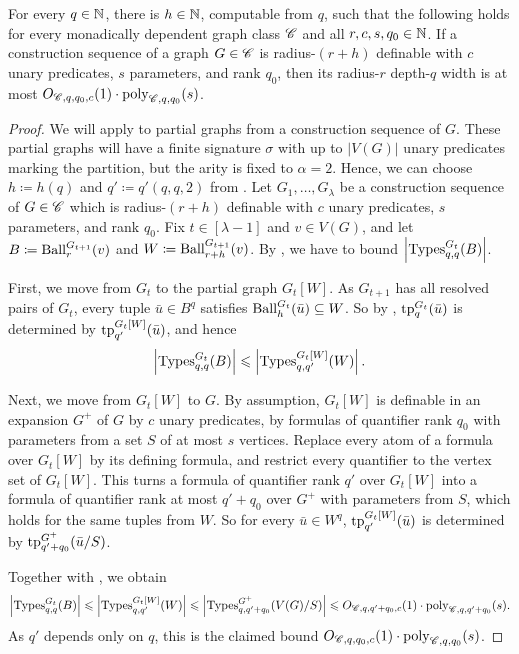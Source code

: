 \begin{lemma}\label{lem:skel-def-to-types}
  For every $q\in\mathbb N$, there is $h\in\mathbb N$, computable from $q$, such that the following holds for every monadically dependent graph class $\mathscr C$ and all $r,c,s,q_0\in\mathbb N$.
  If a construction sequence of a graph $G\in\mathscr C$ is radius-$(r+h)$ definable with $c$ unary predicates, $s$ parameters, and rank $q_0$,
  then its radius-$r$ depth-$q$ width is at most $O_{\mathscr C,q,q_0,c}(1)\cdot\mathrm{poly}_{\mathscr C,q,q_0}(s)$.
\end{lemma}
\begin{proof}
  We will apply  to partial graphs from a construction sequence of $G$.
  These partial graphs will have a finite signature $\sigma$ with up to $|V(G)|$ unary predicates marking the partition, but the arity is fixed to $\alpha=2$.
  Hence, we can choose $h\coloneqq h(q)$ and $q'\coloneqq q'(q,q,2)$ from .
  Let $G_1,\ldots,G_\lambda$ be a construction sequence of $G\in\mathscr C$ which is radius-$(r+h)$ definable with $c$ unary predicates, $s$ parameters, and rank $q_0$.
  Fix $t\in[\lambda-1]$ and $v\in V(G)$, and let $B\coloneqq\operatorname{Ball}^{G_{t+1}}_r(v)$ and $W\coloneqq\operatorname{Ball}^{G_{t+1}}_{r+h}(v)$.
  By , we have to bound $\left|\operatorname{Types}^{G_t}_{q,q}(B)\right|$.

  First, we move from $G_t$ to the partial graph $G_t[W]$.
  As $G_{t+1}$ has all resolved pairs of $G_t$, every tuple $\bar u\in B^q$ satisfies $\operatorname{Ball}^{G_t}_h(\bar u)\subseteq W$.
  So by , $\textnormal{tp}^{G_t}_q(\bar u)$ is determined by $\textnormal{tp}^{G_t[W]}_{q'}(\bar u)$, and hence
  \[
    \left|\operatorname{Types}^{G_t}_{q,q}(B)\right|
    \leqslant\left|\operatorname{Types}^{G_t[W]}_{q,q'}(W)\right|.
  \]

  Next, we move from $G_t[W]$ to $G$.
  By assumption, $G_t[W]$ is definable in an expansion $G^+$ of $G$ by $c$ unary predicates, by formulas of quantifier rank $q_0$ with parameters from a set $S$ of at most $s$ vertices.
  Replace every atom of a formula over $G_t[W]$ by its defining formula, and restrict every quantifier to the vertex set of $G_t[W]$.
  This turns a formula of quantifier rank $q'$ over $G_t[W]$ into a formula of quantifier rank at most $q'+q_0$ over $G^+$ with parameters from $S$,
  which holds for the same tuples from $W$.
  So for every $\bar u\in W^q$, $\textnormal{tp}^{G_t[W]}_{q'}(\bar u)$ is determined by $\textnormal{tp}^{G^+}_{q'+q_0}(\bar u/S)$.

  Together with , we obtain
  \[
    \left|\operatorname{Types}^{G_t}_{q,q}(B)\right|
    \leqslant\left|\operatorname{Types}^{G_t[W]}_{q,q'}(W)\right|
    \leqslant\left|\operatorname{Types}^{G^+}_{q,q'+q_0}(V(G)/S)\right|
    \leqslant O_{\mathscr C,q,q'+q_0,c}(1)\cdot\mathrm{poly}_{\mathscr C,q,q'+q_0}(s).
  \]
  As $q'$ depends only on $q$, this is the claimed bound $O_{\mathscr C,q,q_0,c}(1)\cdot\mathrm{poly}_{\mathscr C,q,q_0}(s)$.
\end{proof}

